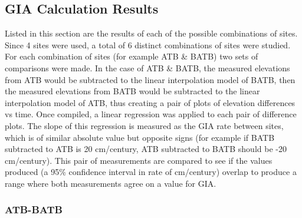 

\subsection{GIA Calculation Results}



 Listed in this section are the results of each of the possible combinations of sites.
 Since 4 sites were used, a total of 6 distinct combinations of sites were studied.
 For each combination of sites (for example ATB \& BATB) two sets of comparisons
 were made. In the case of ATB \& BATB, the measured elevations from ATB would be
 subtracted to the linear interpolation model of BATB, then the measured elevations
 from BATB would be subtracted to the linear interpolation model of ATB, thus
 creating a pair of plots of elevation differences vs time. Once compiled, a linear
 regression was applied to each pair of difference plots. The slope of
 this regression is measured as the GIA rate between sites, which is of
 similar absolute value but opposite signs (for example if BATB subtracted
 to ATB is 20 cm/century, ATB subtracted to BATB should be -20 cm/century).
 This pair of measurements are compared to see if the values produced (a
 95\% confidence interval in rate of cm/century) overlap to produce a
 range where both measurements agree on a value for GIA.


\subsubsection{ATB-BATB}

